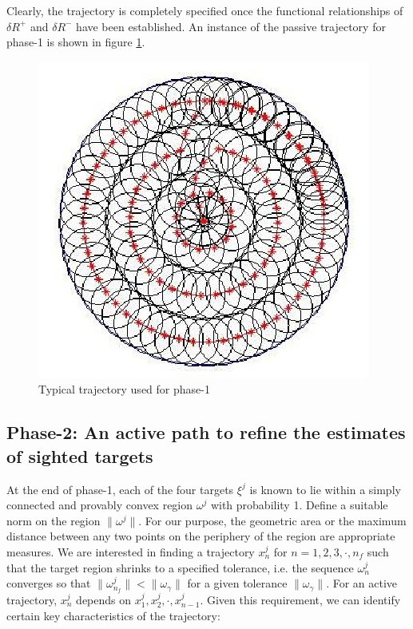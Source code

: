 Clearly, the trajectory is completely specified once the functional relationships of $\delta R^+$ and $\delta R^-$ have been established. An instance of the passive trajectory for phase-1 is shown in figure \ref{fig_mission_phase1_c}.

\begin{figure}
\centering
\includegraphics[scale=0.75]{Figures/mission_phase1_c}
\caption{Typical trajectory used for phase-1}
\label{fig_mission_phase1_c}
\end{figure}


\subsection{Phase-2: An active path to refine the estimates of sighted targets}

At the end of phase-1, each of the four targets $\xi^j$ is known to lie within a simply connected and provably convex region $\omega^j$ with probability 1. Define a suitable norm on the region $\| \omega^j\|$. For our purpose, the geometric area or the maximum distance between any two points on the periphery of the region are appropriate measures. We are interested in finding a trajectory $x^j_n$ for $n=1,2,3, \cdot , n_f$ such that the target region shrinks to a specified tolerance, i.e. the sequence $\omega_n^j$ converges so that $\| \omega^j_{n_f} \| < \| \omega_\gamma \|$  for a given tolerance $\| \omega_\gamma \|$. For an active trajectory, $x^j_n$ depends on $x^j_1, x^j_2, \cdot, x^j_{n-1}$.  Given this requirement, we can identify certain key characteristics of the trajectory:

